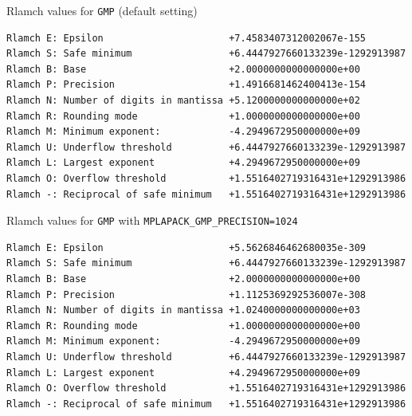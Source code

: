 \documentclass[12pt]{article}
\begin{document}
\begin{table}
\caption{Rlamch values for {\tt GMP} (default setting)}\label{rlamchgmp}
\begin{center}
\begin{verbatim}
Rlamch E: Epsilon                      +7.4583407312002067e-155
Rlamch S: Safe minimum                 +6.4447927660133239e-1292913987
Rlamch B: Base                         +2.0000000000000000e+00
Rlamch P: Precision                    +1.4916681462400413e-154
Rlamch N: Number of digits in mantissa +5.1200000000000000e+02
Rlamch R: Rounding mode                +1.0000000000000000e+00
Rlamch M: Minimum exponent:            -4.2949672950000000e+09
Rlamch U: Underflow threshold          +6.4447927660133239e-1292913987
Rlamch L: Largest exponent             +4.2949672950000000e+09
Rlamch O: Overflow threshold           +1.5516402719316431e+1292913986
Rlamch -: Reciprocal of safe minimum   +1.5516402719316431e+1292913986
\end{verbatim}
\end{center}
\end{table}

\begin{table}
\caption{Rlamch values for {\tt GMP} with {\tt MPLAPACK\_GMP\_PRECISION=1024}} \label{rlamchgmp1024}
\begin{center}
\begin{verbatim}
Rlamch E: Epsilon                      +5.5626846462680035e-309
Rlamch S: Safe minimum                 +6.4447927660133239e-1292913987
Rlamch B: Base                         +2.0000000000000000e+00
Rlamch P: Precision                    +1.1125369292536007e-308
Rlamch N: Number of digits in mantissa +1.0240000000000000e+03
Rlamch R: Rounding mode                +1.0000000000000000e+00
Rlamch M: Minimum exponent:            -4.2949672950000000e+09
Rlamch U: Underflow threshold          +6.4447927660133239e-1292913987
Rlamch L: Largest exponent             +4.2949672950000000e+09
Rlamch O: Overflow threshold           +1.5516402719316431e+1292913986
Rlamch -: Reciprocal of safe minimum   +1.5516402719316431e+1292913986
\end{verbatim}
\end{center}
\end{table}
\end{document}
